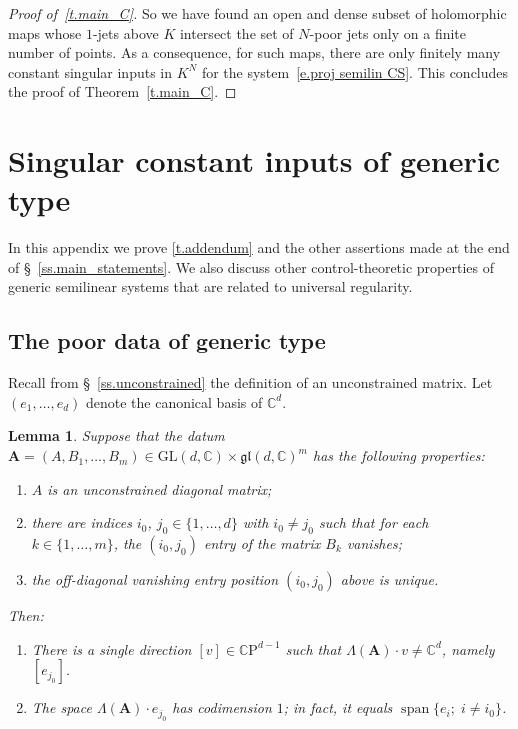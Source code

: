 \documentclass[10pt, a4paper]{amsart}
\theoremstyle{plain}
\newtheorem{lemma}{Lemma}[section]
\theoremstyle{definition}
\theoremstyle{remark}
\theoremstyle{note}
\numberwithin{equation}{section}
\begin{document}
\begin{proof}[Proof of~\cref{t.main_C}]
So we have found an open and dense subset of holomorphic maps whose $1$-jets above $K$ intersect the set of $N$-poor jets only on a finite number of points. As a consequence, for such maps,
there are only finitely many constant singular inputs  in $K^N$ for the system~\ref{e.proj semilin CS}. 
This concludes the proof of Theorem~\ref{t.main_C}.
\end{proof}

\section{Singular constant inputs of generic type} \label{a.generic singular}

In this appendix we prove \cref{t.addendum}
and the other assertions made at the end of \S~\ref{ss.main_statements}.
We also discuss other control-theoretic properties of generic semilinear systems
that are related to universal regularity.

\subsection{The poor data of generic type}\label{ss.additional}

Recall from \S~\ref{ss.unconstrained} the definition of 
an unconstrained matrix.
Let $(e_1, \dots, e_d)$ denote the canonical basis of ${\mathbb{C}}^d$.

\begin{lemma}\label{l.good_poor}
Suppose that the datum ${\mathbf{A}} = (A, B_1, \dots, B_m) \in {\mathrm{GL}}(d,{\mathbb{C}}) \times {\mathfrak{gl}}(d,{\mathbb{C}})^m$
has the following properties:
\begin{enumerate}
\item\label{i.good_hyp_1}
$A$ is an unconstrained diagonal matrix;
\item\label{i.good_hyp_2}
there are indices $i_0$, $j_0 \in \{1,\dots,d\}$ with $i_0 \neq j_0$ 
such that for each $k \in \{1,\dots,m\}$, the $(i_0,j_0)$ entry of the matrix $B_k$ vanishes;
\item\label{i.good_hyp_3}
the off-diagonal vanishing entry position $(i_0,j_0)$ above is unique.
\end{enumerate}
Then:
\begin{enumerate}
\item\label{i.good_conclusion_1}
There is a single direction $[v] \in {\mathbb{C}\mathrm{P}}^{d-1}$ such that $\Lambda({\mathbf{A}}) \cdot v \neq {\mathbb{C}}^d$,
namely~$[e_{j_0}]$.
\item\label{i.good_conclusion_2}
The space $\Lambda({\mathbf{A}}) \cdot e_{j_0}$ has codimension $1$; 
in fact, it equals $\operatorname*{span} \{e_i ; \; i \neq i_0\}$.
\end{enumerate}
\end{lemma}
\end{document}
